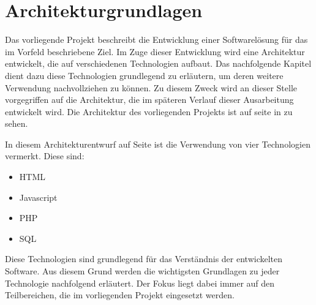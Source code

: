 \section{Architekturgrundlagen}
\label{sec:Architekturgrundlagen}

Das vorliegende Projekt beschreibt die Entwicklung einer Softwarelösung für das im Vorfeld beschriebene Ziel.
Im Zuge dieser Entwicklung wird eine Architektur entwickelt, die auf verschiedenen Technologien aufbaut.
Das nachfolgende Kapitel dient dazu diese Technologien grundlegend zu erläutern, um deren weitere Verwendung
nachvollziehen zu können. Zu diesem Zweck wird an dieser Stelle vorgegriffen auf die Architektur, die im späteren Verlauf dieser Ausarbeitung entwickelt wird. Die Architektur des vorliegenden Projekts ist auf seite \pageref{fig:Architektur} in  zu sehen.

In diesem Architekturentwurf auf Seite \pageref{fig:Architektur} ist die Verwendung von vier Technologien vermerkt. Diese sind:
\begin{itemize}
  \item HTML
  \item Javascript
  \item PHP
  \item SQL
\end{itemize}

Diese Technologien sind grundlegend für das Verständnis der entwickelten Software.
Aus diesem Grund werden die wichtigsten Grundlagen zu jeder Technologie nachfolgend erläutert.
Der Fokus liegt dabei immer auf den Teilbereichen, die im vorliegenden Projekt eingesetzt werden.